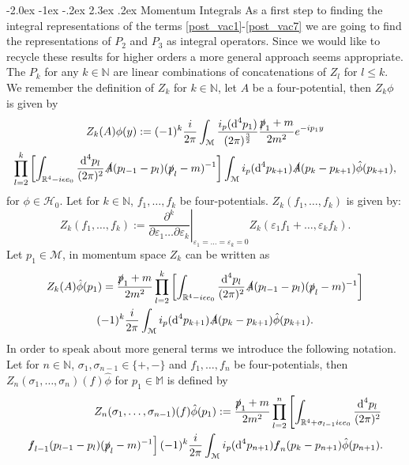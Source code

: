 \documentclass[oneside,reqno,12pt]{amsart}
\makeatletter
\renewcommand\section{\@startsection {section}{1}{\z@}%
                                   {-2.0ex \@plus -1ex \@minus -.2ex}%
                                   {2.3ex \@plus.2ex}%
                                   {\normalfont\Large\bfseries}}
\makeatother
\begin{document}
\section{Momentum Integrals}\label{sec:p_int}
As a first step to finding the integral representations of the terms \eqref{post_vac1}-\eqref{post_vac7} we are going to find the representations of \(P_2\) and \(P_3\) as integral operators. 
Since we would like to recycle these results for higher orders a more general approach seems appropriate. 
The \(P_k\) for any \(k\in\mathbb{N}\) are linear combinations of concatenations of \(Z_l\) for \(l\le k\). 
We remember the definition of \(Z_k\) for \(k\in\mathbb{N}\), let \(A\) be a four-potential, then \(Z_k \phi\) is given by
\begin{multline}
Z_k(A)\phi(y):=(-1)^k \frac{i}{2\pi}  \int_{\mathcal{M}}\frac{i_p(\text{d}^4p_1)}{(2\pi)^{\frac{3}{2}}} \frac{\slashed{p}_1+m}{2m^2} e^{-ip_1y}  \\
  \prod_{l=2}^{k} \left[ \int_{\mathbb{R}^4-i \epsilon e_0}\frac{\text{d}^4p_l}{(2\pi)^{2}} \slashed{A}(p_{l-1}-p_l)  (\slashed{p}_l-m)^{-1}  
 \right]\int_{\mathcal{M}}  i_p(\text{d}^4p_{k+1})\slashed{A}(p_{k}-p_{k+1})\hat{\phi}(p_{k+1})
,\end{multline}
for \(\phi\in \mathcal{H}_0\). Let for \(k\in\mathbb{N}\), \(f_1,\dots, f_k\) be four-potentials. \(Z_k(f_1,\dots,f_k)\) is given by:
\begin{equation}\label{Z_k_multiple_arguments}
Z_k(f_1,\dots,f_k):=\left. \frac{\partial^k}{\partial \varepsilon_1  \dots \partial\varepsilon_k}\right|_{\varepsilon_1=\dots=\varepsilon_k=0} Z_k(\varepsilon_1 f_1+\dots, \varepsilon_k f_k)
.\end{equation}
 Let \(p_1\in \mathcal{M}\), in momentum space \(Z_k\) can be written as
\begin{multline}\label{def_Z_k}
Z_k(A) \hat{\phi}(p_1)=  \frac{\slashed{p}_1+m}{2m^2} \prod_{l=2}^{k} \left[ \int_{\mathbb{R}^4-i \epsilon e_0}\frac{\text{d}^4p_l}{(2\pi)^{2}} \slashed{A}(p_{l-1}-p_l)  (\slashed{p}_l-m)^{-1}  
 \right]\\
 (-1)^k \frac{i}{2\pi} \int_{\mathcal{M}}  i_p(\text{d}^4p_{k+1})\slashed{A}(p_{k}-p_{k+1})\hat{\phi}(p_{k+1})
.\end{multline}
In order to speak about more general terms we introduce the following notation. Let for \(n\in\mathbb{N}\), \(\sigma_1,\sigma_{n-1}\in \{+,-\}\) and \(f_1,\dots, f_n\) be  four-potentials, then \(Z_n (\sigma_1,\dots, \sigma_n)(f)\hat{\phi}\) for \(p_1\in\mathbb{M}\) is defined by
\begin{align}\tag*{}
Z_n (\sigma_1,\dots, \sigma_{n-1})(f)\hat{\phi}(p_1) := \frac{\slashed{p}_1+m}{2m^2} \prod_{l=2}^{n} \left[ \int_{\mathbb{R}^4+\sigma_{l-1} i \epsilon e_0}\frac{\text{d}^4p_l}{(2\pi)^{2}} \right.\\\label{Zsigma}
\left. \slashed{f}_{l-1}(p_{l-1}-p_l)  (\slashed{p}_l-m)^{-1}  \right]
(-1)^k \frac{i}{2\pi}  \int_{\mathcal{M}}  i_p(\text{d}^4p_{n+1})\slashed{f}_n(p_{k}-p_{n+1})\hat{\phi}(p_{n+1})
.\end{align}
\end{document}
